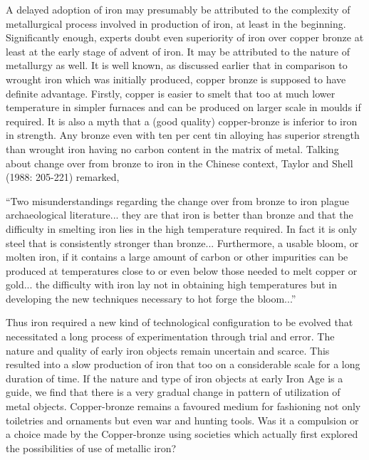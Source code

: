 {A delayed adoption of iron may presumably be attributed to the complexity of metallurgical process involved in production of iron, at least in the beginning. Significantly enough, experts doubt even superiority of iron over copper bronze at least at the early stage of advent of iron. It may be attributed to the nature of metallurgy as well. It is well known, as discussed earlier that in comparison to wrought iron which was initially produced, copper bronze is supposed to have definite advantage. Firstly, copper is easier to smelt that too at much lower temperature in simpler furnaces and can be produced on larger scale in moulds if required. It is also a myth that a (good quality) copper-bronze is inferior to iron in strength. Any bronze even with ten per cent tin alloying has superior strength than wrought iron having no carbon content in the matrix of metal. Talking about change over from bronze to iron in the Chinese context, Taylor and Shell (1988: 205-221) remarked, 

{\footnotesize “Two misunderstandings regarding the change over from bronze to iron plague archaeological literature... they are that iron is better than bronze and that the difficulty in smelting iron lies in the high temperature required. In fact it is only steel that is consistently stronger than bronze... Furthermore, a usable bloom, or molten iron, if it contains a large amount of carbon or other impurities can be produced at temperatures close to or even below those needed to melt copper or gold... the difficulty with iron lay not in obtaining high temperatures but in developing the new techniques necessary to hot forge the bloom...” }

Thus iron required a new kind of technological configuration to be evolved that necessitated a long process of experimentation through trial and error. The nature and quality of early iron objects remain uncertain and scarce. This resulted into a slow production of iron that too on a considerable scale for a long duration of time. If the nature and type of iron objects at early Iron Age is a guide, we find that there is a very gradual change in pattern of utilization of metal objects. Copper-bronze remains a favoured medium for fashioning not only toiletries and ornaments but even war and hunting tools. Was it a compulsion or a choice made by the Copper-bronze using societies which actually first explored the possibilities of use of metallic iron?

\newpage

}
